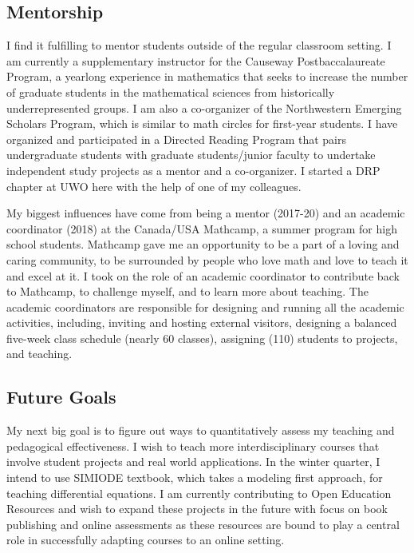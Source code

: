\documentclass[10pt]{amsbook}
\begin{document}
\subsection*{Mentorship}
  I find it fulfilling to mentor students outside of the regular classroom setting. 
  I am currently a supplementary instructor for the Causeway Postbaccalaureate Program, a yearlong experience in mathematics that seeks to increase the number of graduate students in the mathematical sciences from historically underrepresented groups. 
  I am also a co-organizer of the Northwestern Emerging Scholars Program, which is similar to math circles for first-year students.  
  I have organized and participated in a Directed Reading Program that pairs undergraduate students with graduate students/junior faculty to undertake independent study projects as a mentor and a co-organizer. 
  I started a DRP chapter at UWO here with the help of one of my colleagues. 

  My biggest influences have come from being a mentor (2017-20) and an academic coordinator
  (2018) at the Canada/USA Mathcamp, a summer program for high school students.
  Mathcamp gave me an opportunity to be a part of a loving and caring community, to be surrounded by people who love math and love to teach it and excel at it.
  I took on the role of an academic coordinator to contribute back to Mathcamp, to challenge myself, and to learn more about teaching. 
  The academic coordinators are responsible for designing and running all the academic activities, including, inviting and hosting external visitors, designing a balanced five-week class schedule (nearly 60 classes), assigning (110) students to projects, and teaching. 

  \subsection*{Future Goals}
  My next big goal is to figure out ways to quantitatively assess my teaching and pedagogical effectiveness.
  I wish to teach more interdisciplinary courses that involve student projects and real world applications.
  In the winter quarter, I intend to use SIMIODE textbook, which takes a modeling first approach, for teaching differential equations.
  I am currently contributing to Open Education Resources and wish to expand these projects in the future with focus on book publishing and online assessments as these resources are bound to play a central role in successfully adapting courses to an online setting.
\end{document}
